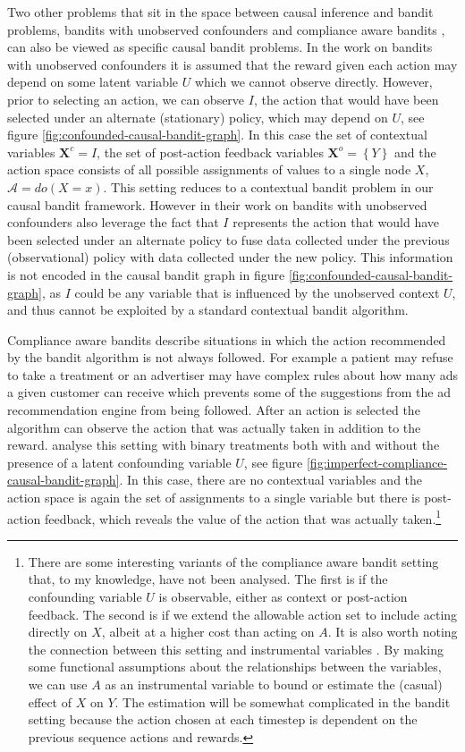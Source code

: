 \documentclass[11pt,a4paper,oneside]{book}
\newcommand{\actionspace}{\mathcal{A}}
\newcommand{\set}[1]{\left\{#1\right\}}
\renewcommand{\vec}[1]{\boldsymbol{#1}}
\theoremstyle{plain}
\theoremstyle{definition}
\begin{document}
Two other problems that sit in the space between causal inference and bandit problems, bandits with unobserved confounders \cite{Bareinboim2015} and compliance aware bandits \citep{DellaPenna2016}, can also be viewed as specific causal bandit problems. In the work on bandits with unobserved confounders it is assumed that the reward given each action may depend on some latent variable $U$ which we cannot observe directly. However, prior to selecting an action, we can observe  $I$, the action that would have been selected under an alternate (stationary) policy, which may depend on $U$, see figure \ref{fig:confounded-causal-bandit-graph}. In this case the set of contextual variables $\vec{X}^c = I$, the set of post-action feedback variables $\vec{X}^o = \set{Y}$ and the action space consists of all possible assignments of values to a single node $X$, $\actionspace = do(X=x)$. This setting reduces to a contextual bandit problem in our causal bandit framework. However in their work on bandits with unobserved confounders \citet{Forney2017} also leverage the fact that $I$ represents the action that would have been selected under an alternate policy to fuse data collected under the previous (observational) policy with data collected under the new policy. This information is not encoded in the causal bandit graph in figure \ref{fig:confounded-causal-bandit-graph}, as $I$ could be any variable that is influenced by the unobserved context $U$, and thus cannot be exploited by a standard contextual bandit algorithm. 

Compliance aware bandits describe situations in which the action recommended by the bandit algorithm is not always followed. For example a patient may refuse to take a treatment or an advertiser may have complex rules about how many ads a given customer can receive which prevents some of the suggestions from the ad recommendation engine from being followed. After an action is selected the algorithm can observe the action that was actually taken in addition to the reward. \citet{DellaPenna2016} analyse this setting with binary treatments both with and without the presence of a latent confounding variable $U$, see figure \ref{fig:imperfect-compliance-causal-bandit-graph}. In this case, there are no contextual variables and the action space is again the set of assignments to a single variable but there is post-action feedback, which reveals the value of the action that was actually taken.\footnote{There are some interesting variants of the compliance aware bandit setting that, to my knowledge, have not been analysed. The first is if the confounding variable $U$ is observable, either as context or post-action feedback. The second is if we extend the allowable action set to include acting directly on $X$, albeit at a higher cost than acting on $A$. It is also worth noting the connection between this setting and instrumental variables \cite{balke1997bounds}. By making some functional assumptions about the relationships between the variables, we can use $A$ as an instrumental variable to bound or estimate the (casual) effect of $X$ on $Y$. The estimation will be somewhat complicated in the bandit setting because the action chosen at each timestep is dependent on the previous sequence actions and rewards.}
\end{document}
